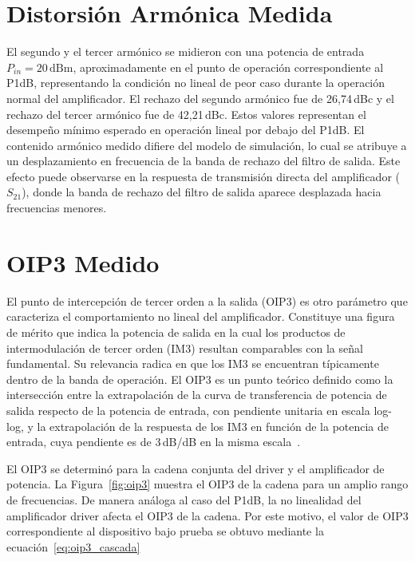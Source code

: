 \section{Distorsión Armónica Medida}
El segundo y el tercer armónico se midieron con una potencia de entrada $P_{in} = 20\,\text{dBm}$, aproximadamente en el punto de operación correspondiente al P1dB, representando la condición no lineal de peor caso durante la operación normal del amplificador. El rechazo del segundo armónico fue de 26{,}74\,dBc y el rechazo del tercer armónico fue de 42{,}21\,dBc. Estos valores representan el desempeño mínimo esperado en operación lineal por debajo del P1dB. El contenido armónico medido difiere del modelo de simulación, lo cual se atribuye a un desplazamiento en frecuencia de la banda de rechazo del filtro de salida. Este efecto puede observarse en la respuesta de transmisión directa del amplificador ($S_{21}$), donde la banda de rechazo del filtro de salida aparece desplazada hacia frecuencias menores.

\section{OIP3 Medido}
El punto de intercepción de tercer orden a la salida (OIP3) es otro parámetro que caracteriza el comportamiento no lineal del amplificador. Constituye una figura de mérito que indica la potencia de salida en la cual los productos de intermodulación de tercer orden (IM3) resultan comparables con la señal fundamental. Su relevancia radica en que los IM3 se encuentran típicamente dentro de la banda de operación. El OIP3 es un punto teórico definido como la intersección entre la extrapolación de la curva de transferencia de potencia de salida respecto de la potencia de entrada, con pendiente unitaria en escala log-log, y la extrapolación de la respuesta de los IM3 en función de la potencia de entrada, cuya pendiente es de 3\,dB/dB en la misma escala~\cite{pozar2011}.

El OIP3 se determinó para la cadena conjunta del driver y el amplificador de potencia. La Figura~\ref{fig:oip3} muestra el OIP3 de la cadena para un amplio rango de frecuencias. De manera análoga al caso del P1dB, la no linealidad del amplificador driver afecta el OIP3 de la cadena. Por este motivo, el valor de OIP3 correspondiente al dispositivo bajo prueba se obtuvo mediante la ecuación~\eqref{eq:oip3_cascada}

